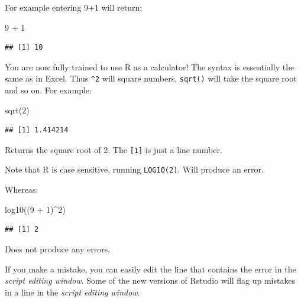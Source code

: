\documentclass[
]{book}
\newenvironment{Shaded}{\begin{snugshade}}{\end{snugshade}}
\newcommand{\DecValTok}[1]{\textcolor[rgb]{0.00,0.00,0.81}{#1}}
\newcommand{\FunctionTok}[1]{\textcolor[rgb]{0.00,0.00,0.00}{#1}}
\newcommand{\NormalTok}[1]{#1}
\newcommand{\SpecialCharTok}[1]{\textcolor[rgb]{0.00,0.00,0.00}{#1}}
\begin{document}
For example entering 9+1 will return:

\begin{Shaded}
\begin{Highlighting}[]
\DecValTok{9} \SpecialCharTok{+} \DecValTok{1}
\end{Highlighting}
\end{Shaded}

\begin{verbatim}
## [1] 10
\end{verbatim}

You are now fully trained to use R as a calculator! The syntax is essentially the same as in Excel. Thus \texttt{\^{}2} will square numbers, \texttt{sqrt()} will take the square root and so on. For example:

\begin{Shaded}
\begin{Highlighting}[]
\FunctionTok{sqrt}\NormalTok{(}\DecValTok{2}\NormalTok{)}
\end{Highlighting}
\end{Shaded}

\begin{verbatim}
## [1] 1.414214
\end{verbatim}

Returns the square root of 2. The \texttt{{[}1{]}} is just a line number.

Note that R is case sensitive, running \texttt{LOG10(2)}. Will produce an error.

Whereas:

\begin{Shaded}
\begin{Highlighting}[]
\FunctionTok{log10}\NormalTok{((}\DecValTok{9} \SpecialCharTok{+} \DecValTok{1}\NormalTok{)}\SpecialCharTok{\^{}}\DecValTok{2}\NormalTok{)}
\end{Highlighting}
\end{Shaded}

\begin{verbatim}
## [1] 2
\end{verbatim}

Does not produce any errors.

If you make a mistake, you can easily edit the line that contains the error in the \emph{script editing window}. Some of the new versions of Rstudio will flag up mistakes in a line in the \emph{script editing window}.
\end{document}
